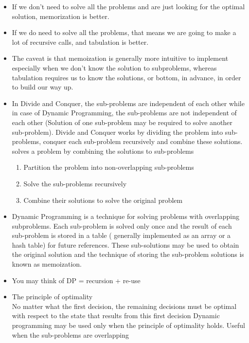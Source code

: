 \documentclass[a4paper,11pt,twoside]{book}
\begin{document}
\begin{itemize}
	\item If we don’t need to solve all the problems and are just looking for the optimal solution, memorization is better.
	
	\item If we do need to solve all the problems, that means we are going to make a lot of recursive calls, and tabulation is better.
	
	\item The caveat is that memoization is generally more intuitive to implement especially when we don’t know the solution to subproblems, whereas tabulation requires us to know the solutions, or bottom, in advance, in order to build our way up.
	
	\item In Divide and Conquer, the sub-problems are independent of each other while in case of Dynamic Programming, the sub-problems are not independent of each other (Solution of one sub-problem may be required to solve another sub-problem). Divide and Conquer works by dividing the problem into sub-problems, conquer each sub-problem recursively and combine these solutions. solves a problem by combining the solutions to sub-problems
	
	\begin{enumerate}
		\item Partition the problem into non-overlapping sub-problems
		\item Solve the sub-problems recursively
		\item Combine their solutions to solve the original problem
	\end{enumerate}
	
	
	\item Dynamic Programming is a technique for solving problems with overlapping subproblems. Each sub-problem is solved only once and the result of each sub-problem is stored in a table ( generally implemented as an array or a hash table) for future references. These sub-solutions may be used to obtain the original solution and the technique of storing the sub-problem solutions is known as memoization.
	
	\item You may think of DP = recursion + re-use
	
	
	\item The principle of optimality \\
	No matter what the first decision, the remaining decisions must be optimal with respect to the state that results from this first decision
	Dynamic programming may be used only when the principle of optimality holds. Useful when the sub-problems are overlapping
	

\end{itemize}
\end{document}
